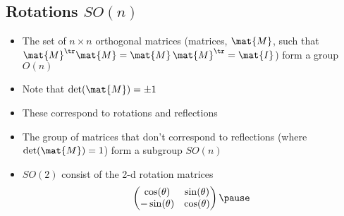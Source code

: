 
\begin{slide}
  \section{Rotations $SO(n)$}
  
\begin{PauseHighLight}
  \begin{itemize}
  \item The set of $n\times n$ orthogonal matrices (matrices, $\mat{M}$,
    such that $\mat{M}^\tr \mat{M} = \mat{M}\, \mat{M}^\tr = \mat{I}$)
    form a group $O(n)$\pause
  \item Note that $\det(\mat{M}) = \pm 1$\pause
  \item These correspond to rotations and reflections\pause
  \item The group of matrices that don't correspond to reflections
    (where $\det(\mat{M})=1$) form a subgroup $SO(n)$\pause
  \item $SO(2)$ consist of the 2-d rotation matrices
    \begin{align*}
      \begin{pmatrix}
        \cos(\theta) & \sin(\theta) \\
        -\sin(\theta) & \cos(\theta)
      \end{pmatrix}\pause
    \end{align*}
  \end{itemize}
\end{PauseHighLight}

\end{slide}



